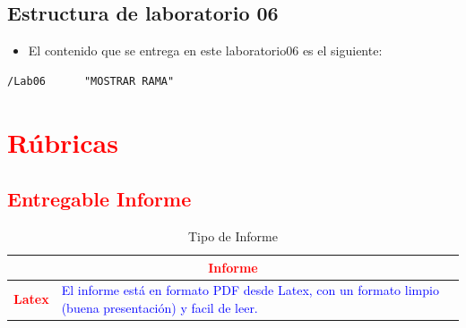 \documentclass{article}
\begin{document}
	\subsection{Estructura de laboratorio 06}
	\begin{itemize}	
		\item El contenido que se entrega en este laboratorio06 es el siguiente:
	\end{itemize}
	\begin{lstlisting}[style=ascii-tree]
	/Lab06		"MOSTRAR RAMA"
	\end{lstlisting}    
	\section{\textcolor{red}{Rúbricas}}
	
	\subsection{\textcolor{red}{Entregable Informe}}
	\begin{table}[H]
		\caption{Tipo de Informe}
		\setlength{\tabcolsep}{0.5em} %
		{\renewcommand{\arraystretch}{1.5}%
		\begin{tabular}{|p{3cm}|p{12cm}|}
			\hline
			\multicolumn{2}{|c|}{\textbf{\textcolor{red}{Informe}}}  \\
			\hline 
			\textbf{\textcolor{red}{Latex}} & \textcolor{blue}{El informe está en formato PDF desde Latex,  con un formato limpio (buena presentación) y facil de leer.}   \\ 
			\hline 
			
			
		\end{tabular}
	}
	\end{table}
	
	\clearpage
	
\end{document}
